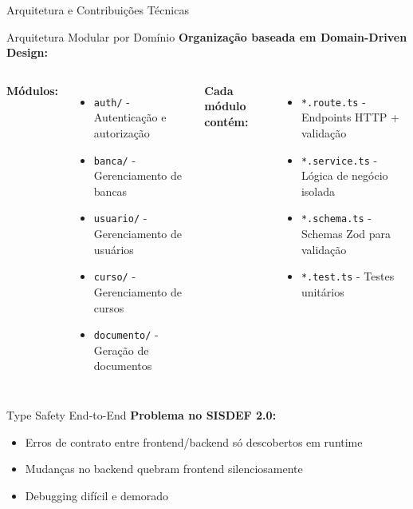 \documentclass[aspectratio=169,xcolor=table]{beamer}
\begin{document}
\begin{frame}[plain]
    \begin{center}
        \Huge Arquitetura e Contribuições Técnicas
    \end{center}
\end{frame}

\begin{frame}{Arquitetura Modular por Domínio}
    \small
    \textbf{Organização baseada em Domain-Driven Design:}
    
    \vspace{0.5em}
    \hspace{0.5em}
    \begin{columns}[T]
        \textbf{Módulos:}
        \begin{itemize}
            \item \texttt{auth/} - Autenticação e autorização
            \item \texttt{banca/} - Gerenciamento de bancas
            \item \texttt{usuario/} - Gerenciamento de usuários
            \item \texttt{curso/} - Gerenciamento de cursos
            \item \texttt{documento/} - Geração de documentos
        \end{itemize}
        
        \textbf{Cada módulo contém:}
        \begin{itemize}
            \item \texttt{*.route.ts} - Endpoints HTTP + validação
            \item \texttt{*.service.ts} - Lógica de negócio isolada
            \item \texttt{*.schema.ts} - Schemas Zod para validação
            \item \texttt{*.test.ts} - Testes unitários
        \end{itemize}
    \end{columns}
\end{frame}

\begin{frame}{Type Safety End-to-End}
    \textbf{Problema no SISDEF 2.0:}
    \begin{itemize}
        \item Erros de contrato entre frontend/backend só descobertos em runtime
        \item Mudanças no backend quebram frontend silenciosamente
        \item Debugging difícil e demorado
    \end{itemize}
\end{frame}
\end{document}
